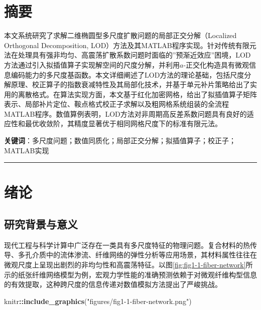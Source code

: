 \documentclass[
]{article}
\author{}
\date{\vspace{-2.5em}}
\newenvironment{Shaded}{\begin{snugshade}}{\end{snugshade}}
\newcommand{\FunctionTok}[1]{\textcolor[rgb]{0.13,0.29,0.53}{\textbf{#1}}}
\newcommand{\NormalTok}[1]{#1}
\newcommand{\SpecialCharTok}[1]{\textcolor[rgb]{0.81,0.36,0.00}{\textbf{#1}}}
\newcommand{\StringTok}[1]{\textcolor[rgb]{0.31,0.60,0.02}{#1}}
\begin{document}
{
\setcounter{tocdepth}{2}
\tableofcontents
}
\section{摘要}\label{intro}

本文系统研究了求解二维椭圆型多尺度扩散问题的局部正交分解（Localized Orthogonal Decomposition, LOD）方法及其MATLAB程序实现。针对传统有限元法在处理具有强非均匀、高震荡扩散系数问题时面临的''预渐近效应''困境，LOD方法通过引入拟插值算子实现解空间的尺度分解，并利用\(a\)-正交化构造具有微观信息编码能力的多尺度基函数。本文详细阐述了LOD方法的理论基础，包括尺度分解原理、校正算子的指数衰减特性及其局部化技术，并基于单元补片策略给出了实用的离散格式。在算法实现方面，本文基于红化加密网格，给出了拟插值算子矩阵表示、局部补片定位、鞍点格式校正子求解以及粗网格系统组装的全流程MATLAB程序。数值算例表明，LOD方法对非周期高反差系数问题具有良好的适应性和最优收敛阶，其精度显著优于相同网格尺度下的标准有限元法。

\textbf{关键词}：多尺度问题；数值同质化；局部正交分解；拟插值算子；校正子；MATLAB实现

\begin{center}\rule{0.5\linewidth}{0.5pt}\end{center}

\section{绪论}\label{chap-1}

\subsection{研究背景与意义}\label{chap-1-1}

现代工程与科学计算中广泛存在一类具有多尺度特征的物理问题。复合材料的热传导、多孔介质中的流体渗流、纤维网络的弹性分析等应用场景，其材料属性往往在微观尺度上呈现出剧烈的非均匀性和高震荡特征。以图\ref{fig:fig1-1-fiber-network}所示的纸张纤维网络模型为例，宏观力学性能的准确预测依赖于对微观纤维构型信息的有效提取，这种跨尺度的信息传递对数值模拟方法提出了严峻挑战。

\begin{Shaded}
\begin{Highlighting}[]
\NormalTok{knitr}\SpecialCharTok{::}\FunctionTok{include\_graphics}\NormalTok{(}\StringTok{"figures/fig1{-}1{-}fiber{-}network.png"}\NormalTok{)}
\end{Highlighting}
\end{Shaded}
\end{document}
